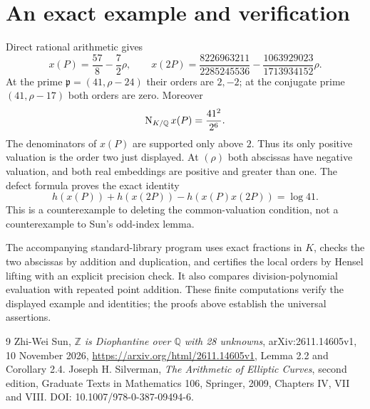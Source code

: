 \documentclass[11pt,a4paper]{article}
\newcommand{\Q}{\mathbb Q}\newcommand{\Z}{\mathbb Z}
\begin{document}
\section{An exact example and verification}
Direct rational arithmetic gives
\[
 x(P)=\frac{57}{8}-\frac72\rho,\qquad
 x(2P)=\frac{8226963211}{2285245536}
       -\frac{1063929023}{1713934152}\rho.
\]
At the prime $\mathfrak p=(41,\rho-24)$ their orders are $2,-2$;
at the conjugate prime $(41,\rho-17)$ both orders are zero.
Moreover
\[
 \N_{K/\Q}x(P)=\frac{41^2}{2^6}.
\]
The denominators of $x(P)$ are supported only above $2$. Thus its only
positive valuation is the order two just displayed. At $(\rho)$ both
abscissas have negative valuation, and both real embeddings are positive
and greater than one. The defect formula proves the exact identity
\[
 h(x(P))+h(x(2P))-h(x(P)x(2P))=\log41.
\]
This is a counterexample to deleting the common-valuation condition,
not a counterexample to Sun's odd-index lemma.

The accompanying standard-library program uses exact fractions in $K$,
checks the two abscissas by addition and duplication, and certifies the
local orders by Hensel lifting with an explicit precision check. It also
compares division-polynomial evaluation with repeated point addition.
These finite computations verify the displayed example and identities;
the proofs above establish the universal assertions.

\begin{thebibliography}{9}
 Zhi-Wei Sun, \emph{$\Z$ is Diophantine over $\Q$ with
28 unknowns}, arXiv:2611.14605v1, 10 November 2026,
\url{https://arxiv.org/html/2611.14605v1}, Lemma 2.2 and Corollary 2.4.
 Joseph H. Silverman, \emph{The Arithmetic of Elliptic
Curves}, second edition, Graduate Texts in Mathematics 106, Springer,
2009, Chapters IV, VII and VIII. DOI: 10.1007/978-0-387-09494-6.
\end{thebibliography}
\end{document}
